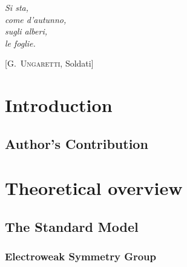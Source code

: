 \documentclass[10pt,twoside,cucitura,classica,english,openany]{toptesi}
\begin{document}

\english

\cleardoublepage

\frontespizio
\paginavuota
\begin{dedica}
\end{dedica}

\ringraziamenti

\tablespagetrue\figurespagetrue \indici

\begin{citazioni}
  \textit{Si sta, \\
    come d'autunno, \\
    sugli alberi, \\
    le foglie.}

  [\textsc{G.~Ungaretti}, Soldati]
\end{citazioni}


\mainmatter

\chapter{Introduction}
\label{cha:intro}



\section{Author's Contribution}
\label{sec:authors-contribution}



\chapter{Theoretical overview}
\label{cha:theoretical-overview}

\section{The Standard Model}
\label{sec:standard-model}



\subsection{Electroweak Symmetry Group}
\label{sec:electro-weak-symm}
\end{document}
